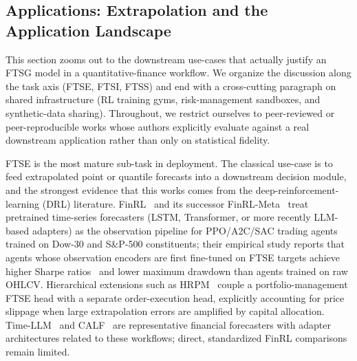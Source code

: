 \subsection{Applications: Extrapolation and the Application Landscape}
\label{sec:applications}

This section zooms out to the downstream use-cases that actually justify an FTSG
model in a quantitative-finance workflow. We organize the discussion
along the task axis (FTSE, FTSI, FTSS) and end with a cross-cutting
paragraph on shared infrastructure (RL training gyms, risk-management
sandboxes, and synthetic-data sharing). Throughout, we restrict
ourselves to peer-reviewed or peer-reproducible works whose authors
explicitly evaluate against a real downstream application rather than
only on statistical fidelity.


FTSE is the most mature sub-task in deployment. The classical use-case
is to feed extrapolated point or quantile forecasts into a downstream
decision module, and the strongest evidence that this works comes from
the deep-reinforcement-learning (DRL) literature.
FinRL~\citep{liu2020finrl} and its successor
FinRL-Meta~\citep{liu2022finrlmeta} treat pretrained time-series
forecasters (LSTM, Transformer, or more recently LLM-based adapters) as
the observation pipeline for PPO/A2C/SAC trading agents~\citep{schulman2017proximal,mnih2016asynchronous,haarnoja2018soft} trained on
Dow-30 and S\&P-500 constituents; their empirical study reports that
agents whose observation encoders are first fine-tuned on FTSE targets
achieve higher Sharpe ratios~\citep{sharpe1994sharpe} and lower maximum drawdown than agents trained on
raw OHLCV. Hierarchical extensions such as
HRPM~\citep{wang2020hrpm} couple a portfolio-management FTSE head with
a separate order-execution head, explicitly accounting for price
slippage when large extrapolation errors are amplified by capital
allocation. Time-LLM~\citep{jin2024timellm} and CALF~\citep{liu2025calf} are representative financial forecasters with adapter architectures related to these workflows; direct, standardized FinRL comparisons remain limited.

